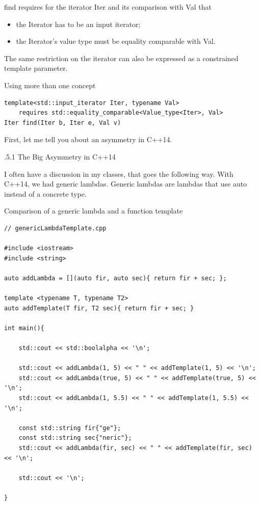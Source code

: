 find requires for the iterator Iter and its comparison with Val that

\begin{itemize}
\item 
the Iterator has to be an input iterator;

\item 
the Iterator’s value type must be equality comparable with Val.
\end{itemize}

The same restriction on the iterator can also be expressed as a constrained template parameter.

\noindent
Using more than one concept
\begin{lstlisting}[style=styleCXX]
template<std::input_iterator Iter, typename Val>
	requires std::equality_comparable<Value_type<Iter>, Val>
Iter find(Iter b, Iter e, Val v)
\end{lstlisting}


First, let me tell you about an asymmetry in C++14.

.5.1\hspace{0.2cm} The Big Asymmetry in C++14

I often have a discussion in my classes, that goes the following way. With C++14, we had generic lambdas. Generic lambdas are lambdas that use auto instead of a concrete type.

\noindent
Comparison of a generic lambda and a function template
\begin{lstlisting}[style=styleCXX]
// genericLambdaTemplate.cpp

#include <iostream>
#include <string>

auto addLambda = [](auto fir, auto sec){ return fir + sec; };

template <typename T, typename T2>
auto addTemplate(T fir, T2 sec){ return fir + sec; }

int main(){

	std::cout << std::boolalpha << '\n';
	
	std::cout << addLambda(1, 5) << " " << addTemplate(1, 5) << '\n';
	std::cout << addLambda(true, 5) << " " << addTemplate(true, 5) << '\n';
	std::cout << addLambda(1, 5.5) << " " << addTemplate(1, 5.5) << '\n';
	
	const std::string fir{"ge"};
	const std::string sec{"neric"};
	std::cout << addLambda(fir, sec) << " " << addTemplate(fir, sec) << '\n';
	
	std::cout << '\n';

}
\end{lstlisting}

